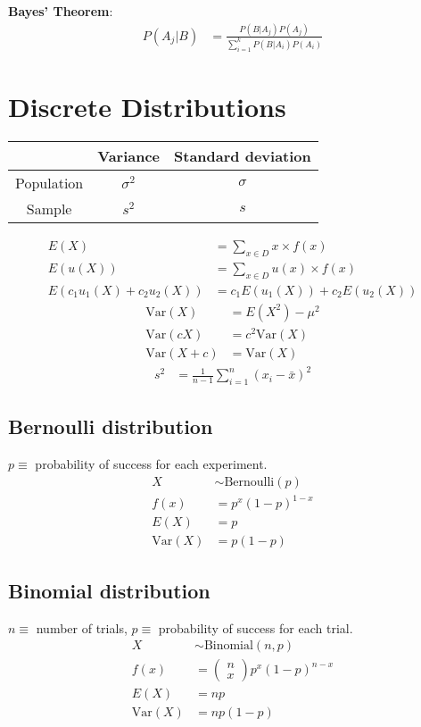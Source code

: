 \documentclass{article}
\newcommand{\var}{\text{Var}}
\newcommand{\bernoulli}{\text{Bernoulli}}
\newcommand{\binomial}{\text{Binomial}}
\begin{document}
\begin{multicols*}{2}
\textbf{Bayes' Theorem}:
\begin{align*}
    P(A_j|B) &= \frac{P(B|A_j) P(A_j)}{\sum_{i = 1}^k P(B|A_i) P(A_i)}
\end{align*}

\section{Discrete Distributions}

\begin{center}
    \begin{tabular}{|c|c|c|}
        \hline
        & Variance & Standard deviation \\ \hline
        Population & $\sigma^2$ & $\sigma$ \\ \hline
        Sample & $s^2$ & $s$ \\ \hline
    \end{tabular}
\end{center}
\begin{align*}
    E(X) &= \sum_{x \in D} x \times f(x) \\
    E(u(X)) &= \sum_{x \in D} u(x) \times f(x) \\
    E(c_1 u_1(X) + c_2 u_2(X)) &= c_1 E(u_1(X)) + c_2 E(u_2(X))
\end{align*}
\begin{align*}
    \var(X) &= E(X^2) - \mu^2 \\
    \var(cX) &= c^2 \var(X) \\
    \var(X + c) &= \var(X)
\end{align*}
\begin{align*}
    s^2 &= \frac{1}{n - 1} \sum_{i = 1}^n (x_i - \bar{x})^2
\end{align*}

\subsection{Bernoulli distribution}

$p \equiv$ probability of success for each experiment.
\begin{align*}
    X &\sim \bernoulli(p) \\
    f(x) &= p^x (1-p)^{1-x} \\
    E(X) &= p \\
    \var(X) &= p(1-p)
\end{align*}

\subsection{Binomial distribution}
$n \equiv$ number of trials, $p \equiv$ probability of success for each trial.
\begin{align*}
    X &\sim \binomial(n, p) \\
    f(x) &= \begin{pmatrix}
        n \\
        x
    \end{pmatrix} p^x (1-p)^{n-x} \\
    E(X) &= np \\
    \var(X) &= np(1-p)
\end{align*}


\end{multicols*}
\end{document}
